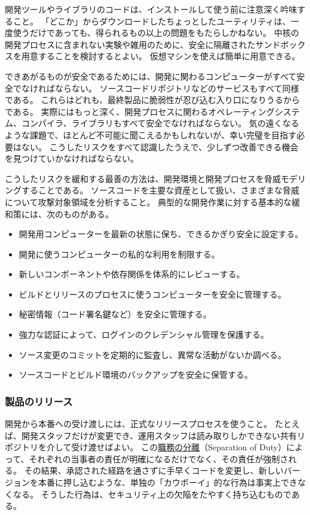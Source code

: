 \documentclass[uplatex]{jsarticle}
\begin{document}
開発ツールやライブラリのコードは、インストールして使う前に注意深く吟味すること。
「どこか」からダウンロードしたちょっとしたユーティリティは、一度使うだけであっても、得られるもの以上の問題をもたらしかねない。
中核の開発プロセスに含まれない実験や雑用のために、安全に隔離されたサンドボックスを用意することを検討するとよい。
仮想マシンを使えば簡単に用意できる。

できあがるものが安全であるためには、開発に関わるコンピューターがすべて安全でなければならない。
ソースコードリポジトリなどのサービスもすべて同様である。
これらはどれも、最終製品に脆弱性が忍び込む入り口になりうるからである。
実際にはもっと深く、開発プロセスに関わるオペレーティングシステム、コンパイラ、ライブラリもすべて安全でなければならない。
気の遠くなるような課題で、ほとんど不可能に聞こえるかもしれないが、幸い完璧を目指す必要はない。
こうしたリスクをすべて認識したうえで、少しずつ改善できる機会を見つけていかなければならない。

こうしたリスクを緩和する最善の方法は、開発環境と開発プロセスを脅威モデリングすることである。
ソースコードを主要な資産として扱い、さまざまな脅威について攻撃対象領域を分析すること。
典型的な開発作業に対する基本的な緩和策には、次のものがある。
\begin{itemize}
\item 開発用コンピューターを最新の状態に保ち、できるかぎり安全に設定する。
\item 開発に使うコンピューターの私的な利用を制限する。
\item 新しいコンポーネントや依存関係を体系的にレビューする。
\item ビルドとリリースのプロセスに使うコンピューターを安全に管理する。
\item 秘密情報（コード署名鍵など）を安全に管理する。
\item 強力な認証によって、ログインのクレデンシャル管理を保護する。
\item ソース変更のコミットを定期的に監査し、異常な活動がないか調べる。
\item ソースコードとビルド環境のバックアップを安全に保管する。
\end{itemize}

\subsubsection{製品のリリース}

開発から本番への受け渡しには、正式なリリースプロセスを使うこと。
たとえば、開発スタッフだけが変更でき、運用スタッフは読み取りしかできない共有リポジトリを介して受け渡せばよい。
この\underline{職務の分離}（Separation of Duty）によって、それぞれの当事者の責任が明確になるだけでなく、その責任が強制される。
その結果、承認された経路を通さずに手早くコードを変更し、新しいバージョンを本番に押し込むような、単独の「カウボーイ」的な行為は事実上できなくなる。
そうした行為は、セキュリティ上の欠陥をたやすく持ち込むものである。
\end{document}
